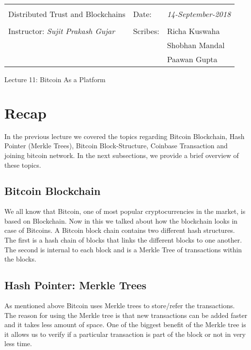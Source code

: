 \documentclass[10pt,a4paper]{article}
\begin{document}
\begin{table}[!h]
\centering
\begin{tabularx}{\textwidth}{|Xll|}
\hline
& &\\
Distributed Trust and Blockchains &  Date: & \emph{14-September-2018}\\
 & &\\
Instructor: \emph{Sujit Prakash Gujar} & Scribes: & Richa Kuswaha \\
& & Shobhan Mandal \\
& & Paawan Gupta \\
 \hline

\end{tabularx}
\end{table}

\begin{center}
\begin{LARGE}
Lecture 11: Bitcoin As a Platform
\end{LARGE}
\end{center}



\section{Recap}

In the previous lecture we covered the topics regarding Bitcoin Blockchain, Hash Pointer (Merkle Trees), Bitcoin Block-Structure, Coinbase Transaction and joining bitcoin network. In the next subsections, we provide a brief overview of these topics.  
\subsection{Bitcoin Blockchain}
We all know that Bitcoin, one of most popular cryptocurrencies in the market, is based on Blockchain. Now in this we talked about how the blockchain looks in case of Bitcoins. A Bitcoin block chain contains two different hash structures. The first is a hash chain of blocks that links the different blocks to one another. The second is internal to each block and is a Merkle Tree of transactions within the blocks. 

\subsection{Hash Pointer: Merkle Trees}
As mentioned above Bitcoin uses Merkle trees to store/refer the transactions. The reason for using the Merkle tree is that new transactions can be added faster and it takes less amount of space. One of the biggest benefit of the Merkle tree is it allows us to verify if a particular transaction is part of the block or not in very less time.   
\end{document}
